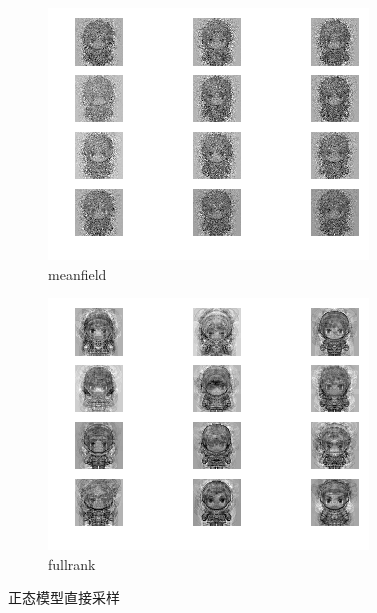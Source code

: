 \documentclass[twocolumn,11pt]{ctexart}
\begin{document}
\begin{figure}[htb]
    \centering
    \begin{subfigure}[b]{0.7\linewidth}
        \includegraphics[width=\linewidth]{meanfield.png}
        \caption{meanfield}
      \end{subfigure}
      \begin{subfigure}[b]{0.7\linewidth}
        \includegraphics[width=\linewidth]{fullrank.png}
        \caption{fullrank}
      \end{subfigure}
      \caption{正态模型直接采样}
      \label{fig:meanfieldfullrank}
\end{figure}
\end{document}
